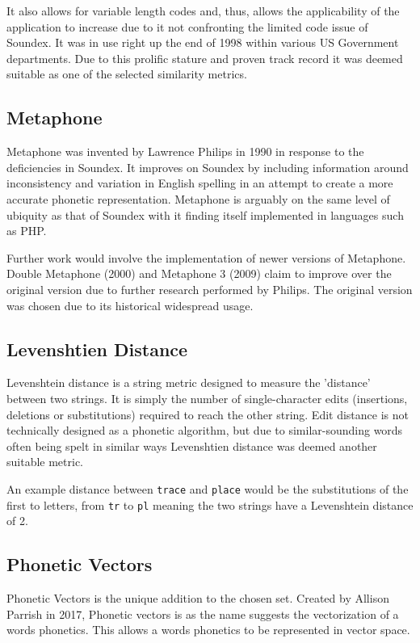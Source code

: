 It also allows for variable length codes and, thus, allows the applicability of the application to increase due to it not confronting the limited code issue of Soundex. It was in use right up the end of 1998 within various US Government departments. Due to this prolific stature and proven track record it was deemed suitable as one of the selected similarity metrics.

\subsection{Metaphone}
Metaphone was invented by Lawrence Philips in 1990\cite{philips1990hanging} in response to the deficiencies in Soundex. It improves on Soundex by including information around inconsistency and variation in English spelling in an attempt to create a more accurate phonetic representation. Metaphone is arguably on the same level of ubiquity as that of Soundex with it finding itself implemented in languages such as PHP\cite{php}. 

Further work would involve the implementation of newer versions of Metaphone. Double Metaphone (2000) and Metaphone 3 (2009) claim to improve over the original version due to further research performed by Philips. The original version was chosen due to its historical widespread usage.

\subsection{Levenshtien Distance}
Levenshtein distance is a string metric designed to measure the 'distance' between two strings. It is simply the number of single-character edits (insertions, deletions or substitutions) required to reach the other string. Edit distance is not technically designed as a phonetic algorithm, but due to similar-sounding words often being spelt in similar ways\cite{hettiarachchi2012sparcl} Levenshtien distance was deemed another suitable metric.

An example distance between \verb|trace| and \verb|place| would be the substitutions of the first to letters, from \verb|tr| to \verb|pl| meaning the two strings have a Levenshtein distance of 2.

\subsection{Phonetic Vectors}
Phonetic Vectors is the unique addition to the chosen set. Created by Allison Parrish in 2017\cite{parrish2017poetic}, Phonetic vectors is as the name suggests the vectorization of a words phonetics. This allows a words phonetics to be represented in vector space.

